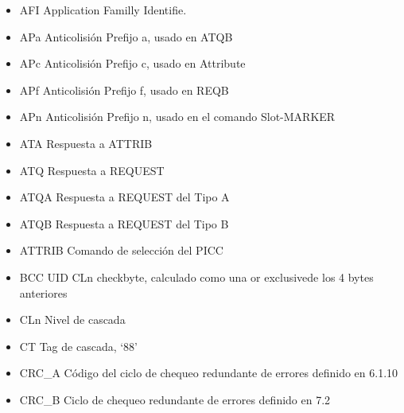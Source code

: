 \begin{itemize}
	\item AFI Application Familly Identifie.\par

	\item APa Anticolisión Prefijo a, usado en ATQB\par

	\item APc Anticolisión Prefijo c, usado en Attribute\par

	\item APf Anticolisión Prefijo f, usado en REQB\par

	\item APn Anticolisión Prefijo n, usado en el comando Slot-MARKER\par

	\item ATA Respuesta a ATTRIB\par

	\item ATQ Respuesta a REQUEST\par

	\item ATQA Respuesta a REQUEST del Tipo A\par

	\item ATQB Respuesta a REQUEST del Tipo B\par

	\item ATTRIB Comando de selección del PICC\par

	\item BCC UID CLn checkbyte, calculado como una or exclusivede los 4 bytes anteriores\par

	\item CLn Nivel de cascada\par

	\item CT Tag de cascada, ‘88’\par

	\item CRC\_A Código del ciclo de chequeo redundante de errores definido en 6.1.10\par

	\item CRC\_B Ciclo de chequeo redundante de errores definido en 7.2\par


\end{itemize}

